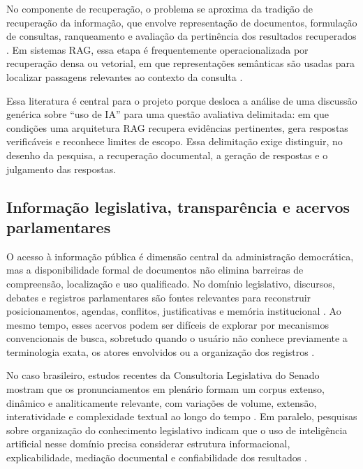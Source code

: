 No componente de recuperação, o problema se aproxima da tradição de recuperação da informação, que envolve representação de documentos, formulação de consultas, ranqueamento e avaliação da pertinência dos resultados recuperados \parencite{manningEtAl2008informationRetrieval}. Em sistemas RAG, essa etapa é frequentemente operacionalizada por recuperação densa ou vetorial, em que representações semânticas são usadas para localizar passagens relevantes ao contexto da consulta \parencite{karpukhinEtAl2020dpr,thakurEtAl2021beir}.

Essa literatura é central para o projeto porque desloca a análise de uma discussão genérica sobre ``uso de IA'' para uma questão avaliativa delimitada: em que condições uma arquitetura RAG recupera evidências pertinentes, gera respostas verificáveis e reconhece limites de escopo. Essa delimitação exige distinguir, no desenho da pesquisa, a recuperação documental, a geração de respostas e o julgamento das respostas.

\subsection{Informação legislativa, transparência e acervos parlamentares}

O acesso à informação pública é dimensão central da administração democrática, mas a disponibilidade formal de documentos não elimina barreiras de compreensão, localização e uso qualificado. No domínio legislativo, discursos, debates e registros parlamentares são fontes relevantes para reconstruir posicionamentos, agendas, conflitos, justificativas e memória institucional \parencite{skubicFiser2024discourseReview}. Ao mesmo tempo, esses acervos podem ser difíceis de explorar por mecanismos convencionais de busca, sobretudo quando o usuário não conhece previamente a terminologia exata, os atores envolvidos ou a organização dos registros \parencite{bandeiraBernardes2016information,geunis2023parliamentaryMonitoring}.

No caso brasileiro, estudos recentes da Consultoria Legislativa do Senado mostram que os pronunciamentos em plenário formam um corpus extenso, dinâmico e analiticamente relevante, com variações de volume, extensão, interatividade e complexidade textual ao longo do tempo \parencite{blanco2025plenarioPalanqueEstudio,blanco2026letrasGraudas}. Em paralelo, pesquisas sobre organização do conhecimento legislativo indicam que o uso de inteligência artificial nesse domínio precisa considerar estrutura informacional, explicabilidade, mediação documental e confiabilidade dos resultados \parencite{martelloteViola2025organizacaoConhecimento}.

